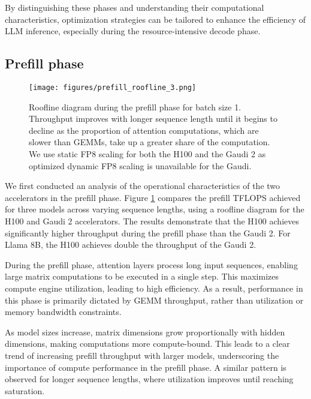By distinguishing these phases and understanding their computational characteristics, optimization strategies can be tailored to enhance the efficiency of LLM inference, especially during the resource-intensive decode phase.

\subsection{Prefill phase}

\begin{figure}[]
    \centering
    \texttt{[image: figures/prefill\_roofline\_3.png]}
    \vspace{-1.6em}
    \caption{Roofline diagram during the prefill phase for batch size 1. Throughput improves with longer sequence length until it begins to decline as the proportion of attention computations, which are slower than GEMMs, take up a greater share of the computation. We use static FP8 scaling for both the H100 and the Gaudi 2 as optimized dynamic FP8 scaling is unavailable for the Gaudi.}
    \label{fig:prefill_roofline}
    \vskip -0.1in
\end{figure}




We first conducted an analysis of the operational characteristics of the two accelerators in the prefill phase.
Figure \ref{fig:prefill_roofline} compares the prefill TFLOPS achieved for three models across varying sequence lengths, using a roofline diagram for the H100 and Gaudi 2 accelerators.
The results demonstrate that the H100 achieves significantly higher throughput during the prefill phase than the Gaudi 2. For Llama 8B, the H100 achieves double the throughput of the Gaudi 2.

During the prefill phase, attention layers process long input sequences, enabling large matrix computations to be executed in a single step. This maximizes compute engine utilization, leading to high efficiency. As a result, performance in this phase is primarily dictated by GEMM throughput, rather than utilization or memory bandwidth constraints.

As model sizes increase, matrix dimensions grow proportionally with hidden dimensions, making computations more compute-bound. This leads to a clear trend of increasing prefill throughput with larger models, underscoring the importance of compute performance in the prefill phase. A similar pattern is observed for longer sequence lengths, where utilization improves until reaching saturation.


